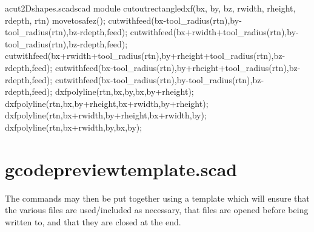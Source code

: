 \documentclass{ltxdoc}
\begin{document}
\lstset{firstnumber=\thecuttwod}
\begin{writecode}{a}{cut2Dshapes.scad}{scad}
module cutoutrectangledxf(bx, by, bz, rwidth, rheight, rdepth, rtn) {
  movetosafez();
  cutwithfeed(bx-tool_radius(rtn),by-tool_radius(rtn),bz-rdepth,feed);
  cutwithfeed(bx+rwidth+tool_radius(rtn),by-tool_radius(rtn),bz-rdepth,feed);
  cutwithfeed(bx+rwidth+tool_radius(rtn),by+rheight+tool_radius(rtn),bz-rdepth,feed);
  cutwithfeed(bx-tool_radius(rtn),by+rheight+tool_radius(rtn),bz-rdepth,feed);
  cutwithfeed(bx-tool_radius(rtn),by-tool_radius(rtn),bz-rdepth,feed);
  dxfpolyline(rtn,bx,by,bx,by+rheight);
  dxfpolyline(rtn,bx,by+rheight,bx+rwidth,by+rheight);
  dxfpolyline(rtn,bx+rwidth,by+rheight,bx+rwidth,by);
  dxfpolyline(rtn,bx+rwidth,by,bx,by);
}

\end{writecode}
\addtocounter{cuttwod}{13}

\section{gcodepreviewtemplate.scad}

The commands may then be put together using a template which will ensure that
the various files are used/included as necessary, that files are opened before
being written to, and that they are closed at the end.
 
\end{document}
